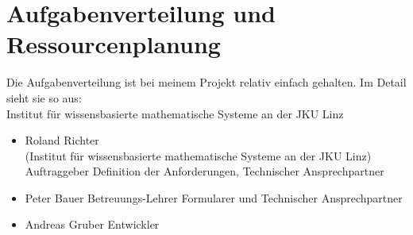 

\section{Aufgabenverteilung und Ressourcenplanung}
Die Aufgabenverteilung ist bei meinem Projekt relativ einfach gehalten.
Im Detail sieht sie so aus: \\
Institut für wissensbasierte mathematische Systeme an der JKU Linz
\begin{itemize}
\item Roland Richter \\ (Institut für wissensbasierte mathematische Systeme an der JKU Linz)
\subitem Auftraggeber
\subitem Definition der Anforderungen, Technischer Ansprechpartner
\item Peter Bauer
\subitem Betreuungs-Lehrer
\subitem Formularer und Technischer Ansprechpartner
\item Andreas Gruber
\subitem Entwickler
\end{itemize}

